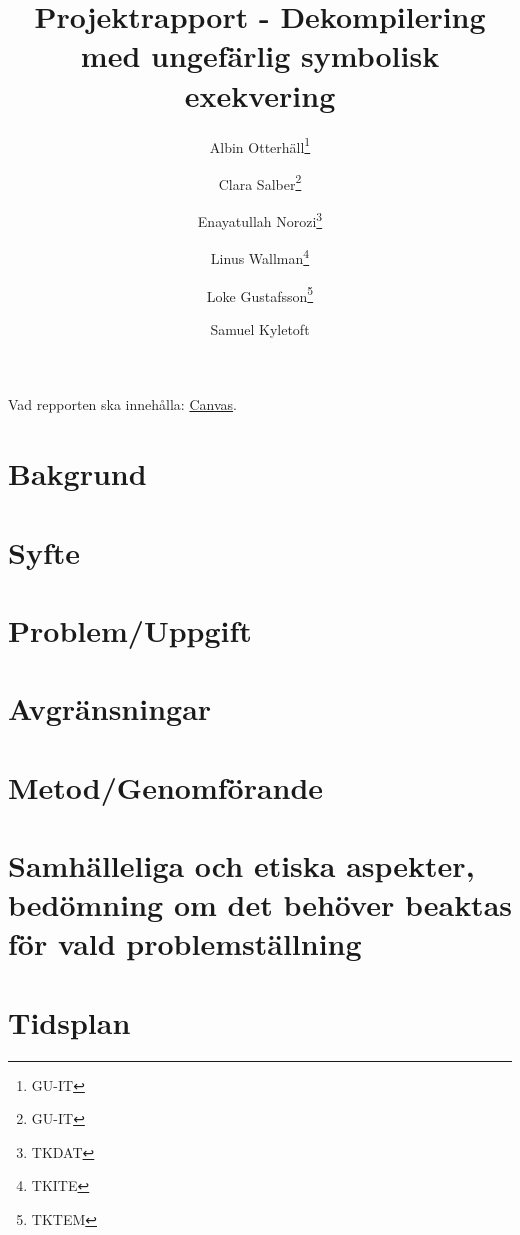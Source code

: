 \documentclass[12pt, a4paper]{article}
\title{Projektrapport - Dekompilering med ungefärlig symbolisk exekvering}
\author{
    Albin Otterhäll\thanks{GU-IT} \and
    Clara Salber\thanks{GU-IT} \and
    Enayatullah Norozi\thanks{TKDAT} \and
    Linus Wallman\thanks{TKITE} \and
    Loke Gustafsson\thanks{TKTEM} \and
    Samuel Kyletoft\footnotemark[3]
}
\begin{document}
\maketitle

\newpage

\listoftodos
\newpage

\tableofcontents
\newpage

Vad repporten ska innehålla:
\href{https://chalmers.instructure.com/courses/22323/assignments/66457?module_item_id=337856}{Canvas}.

\section{Bakgrund}


\section{Syfte}


\section{Problem/Uppgift}


\section{Avgränsningar}


\section{Metod/Genomförande}


\section{Samhälleliga och etiska aspekter, bedömning om det behöver beaktas för vald problemställning}


\section{Tidsplan}


\end{document}
